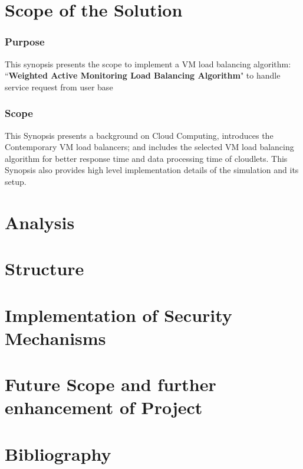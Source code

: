 \documentclass[hidelinks,a4paper,12pt]{article}
\begin{document}
\newpage 

\section{Scope of the Solution}
\subsubsection{Purpose}
This synopsis presents the scope to implement a VM load balancing algorithm: ``\textbf {Weighted Active Monitoring Load Balancing Algorithm}" to handle service request from user base
\\

\noindent
\subsubsection{Scope}
This Synopsis presents a background on Cloud Computing, introduces the Contemporary VM load balancers; and includes the selected VM load balancing algorithm for better response time and data processing time of cloudlets. This Synopsis also provides high level implementation details of the simulation and its setup.

\section{Analysis}

\section{Structure}

\section{Implementation of Security Mechanisms}

\section{Future Scope and further enhancement of Project}

\section{Bibliography}
\end{document}
